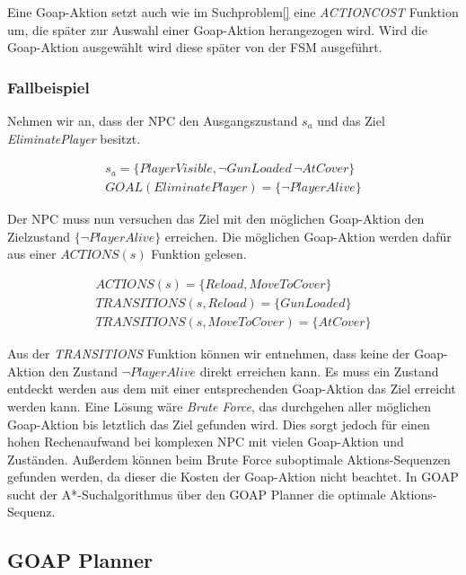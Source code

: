 Eine Goap-Aktion setzt auch wie im Suchproblem\ref{} eine \textit{ACTIONCOST} Funktion um, die später zur Auswahl einer Goap-Aktion herangezogen wird. Wird die Goap-Aktion ausgewählt wird diese später von der FSM ausgeführt.


\subsubsection{Fallbeispiel}
\label{chap:goap action beispiel}

Nehmen wir an, dass der NPC den Ausgangszustand $s_a$ und das Ziel \textit{EliminatePlayer} besitzt.

\begin{align}
	s_a = \{\textit{PlayerVisible}, \lnot \textit{GunLoaded}\, \lnot \textit{AtCover}\} \\
	\textit{GOAL}(\textit{EliminatePlayer}) = \{\lnot \textit{PlayerAlive}\}
\end{align}


Der NPC muss nun versuchen das Ziel mit den möglichen Goap-Aktion den Zielzustand $\{\lnot \textit{PlayerAlive}\}$ erreichen. Die möglichen Goap-Aktion werden dafür aus einer $\textit{ACTIONS}(s)$ Funktion gelesen.

\begin{align}
	\textit{ACTIONS}(s) = \{\textit{Reload}, \textit{MoveToCover}\} \\
	\textit{TRANSITIONS}(s,\textit{Reload}) = \{\textit{GunLoaded}\} \\
	\textit{TRANSITIONS}(s,\textit{MoveToCover}) = \{\textit{AtCover}\}
\end{align}


Aus der \textit{TRANSITIONS} Funktion können wir entnehmen, dass keine der Goap-Aktion den Zustand $\lnot \textit{PlayerAlive}$ direkt erreichen kann. Es muss ein Zustand entdeckt werden aus dem mit einer entsprechenden Goap-Aktion das Ziel erreicht werden kann. Eine Lösung wäre \textit{Brute Force}, das durchgehen aller möglichen Goap-Aktion bis letztlich das Ziel gefunden wird. Dies sorgt jedoch für einen hohen Rechenaufwand bei komplexen NPC mit vielen Goap-Aktion und Zuständen. Außerdem können beim Brute Force suboptimale Aktions-Sequenzen gefunden werden, da dieser die Kosten der Goap-Aktion nicht beachtet. In GOAP sucht der A*-Suchalgorithmus über den GOAP Planner die optimale Aktions-Sequenz.


\subsection{GOAP Planner}
\label{chap:goap planner}

